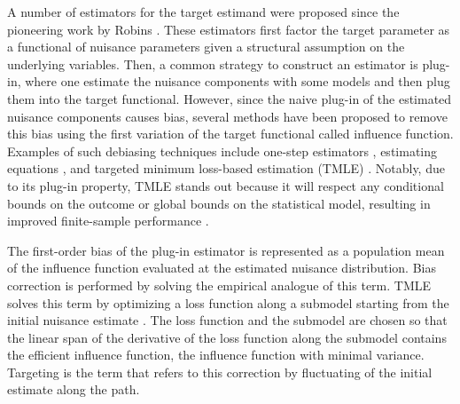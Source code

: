 \documentclass{article}
\theoremstyle{plain}
\theoremstyle{definition}
\theoremstyle{remark}
\begin{document}
A number of estimators for the target estimand were proposed since the pioneering work by Robins \cite{robins1986new}. These estimators first factor the target parameter as a functional of nuisance parameters given a structural assumption on the underlying variables. Then, a common strategy to construct an estimator is plug-in, where one estimate the nuisance components with some models and then plug them into the target functional. However, since the naive plug-in of the estimated nuisance components causes bias, several methods have been proposed to remove this bias using the first variation of the target functional called influence function. Examples of such debiasing techniques include one-step estimators \cite{klaassen1987,bkrw}, estimating equations \cite{robins1994, cherLocally}, and targeted minimum loss-based estimation (TMLE) \cite{laanTLBook2011}. Notably, due to its plug-in property, TMLE stands out because it will respect any conditional bounds on the outcome or global bounds on the statistical model, resulting in improved finite-sample performance \cite{tmle_plug_in}. 

The first-order bias of the plug-in estimator is represented as a population mean of the influence function evaluated at the estimated nuisance distribution. Bias correction is performed by solving the empirical analogue of this term. TMLE solves this term by optimizing a loss function along a submodel starting from the initial nuisance estimate \cite{bangDoublyRobustEstimation2005, laanTMLE2006, laanTLBook2011}. The loss function and the submodel are chosen so that the linear span of the derivative of the loss function along the submodel contains the efficient influence function, the influence function with minimal variance. Targeting is the term that refers to this correction by fluctuating of the initial estimate along the path.
\end{document}
